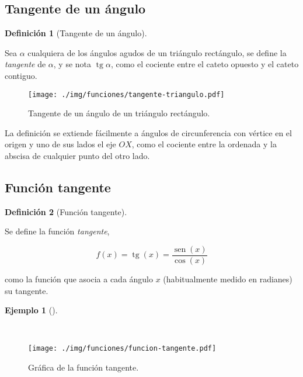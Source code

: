 \documentclass[
  a4paper,
]{scrreport}
\theoremstyle{definition}
\theoremstyle{definition}
\newtheorem{example}{Ejemplo}[chapter]
\theoremstyle{definition}
\newtheorem{definition}{Definición}[chapter]
\theoremstyle{plain}
\theoremstyle{plain}
\theoremstyle{plain}
\theoremstyle{remark}
\begin{document}
\subsection{Tangente de un ángulo}\label{tangente-de-un-uxe1ngulo}

\begin{definition}[Tangente de un
ángulo]\protect\hypertarget{def-tangente-angulo}{}\label{def-tangente-angulo}

Sea \(\alpha\) cualquiera de los ángulos agudos de un triángulo
rectángulo, se define la \emph{tangente} de \(\alpha\), y se nota
\(\operatorname{tg} \alpha\), como el cociente entre el cateto opuesto y
el cateto contiguo.

\end{definition}

\begin{figure}[H]

{\centering \texttt{[image: ./img/funciones/tangente-triangulo.pdf]}

}

\caption{Tangente de un ángulo de un triángulo rectángulo.}

\end{figure}%

La definición se extiende fácilmente a ángulos de circunferencia con
vértice en el origen y uno de sus lados el eje \(OX\), como el cociente
entre la ordenada y la abscisa de cualquier punto del otro lado.

\subsection{Función tangente}\label{funciuxf3n-tangente}

\begin{definition}[Función
tangente]\protect\hypertarget{def-funcion-tangente}{}\label{def-funcion-tangente}

Se define la función \emph{tangente},

\[f(x)=\operatorname{tg}(x)=\frac{\operatorname{sen}(x)}{\cos(x)}\]

como la función que asocia a cada ángulo \(x\) (habitualmente medido en
radianes) su tangente.

\end{definition}

\begin{example}[]\protect\hypertarget{exm-funcion-tangente}{}\label{exm-funcion-tangente}

~

\begin{figure}[H]

{\centering \texttt{[image: ./img/funciones/funcion-tangente.pdf]}

}

\caption{Gráfica de la función tangente.}

\end{figure}%

\end{example}
\end{document}
